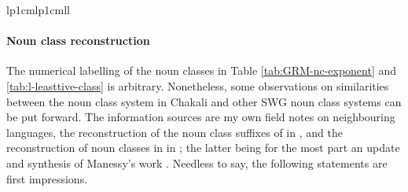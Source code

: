 \begin{exe}
\begin{exe}
\begin{exe}
\begin{exe}
\begin{exe}
\begin{exe}
\begin{table}
\begin{Itabular}{lp{1cm}lp{1cm}ll}
  
 \lspbottomrule
   \end{Itabular}
 \end{table}

\paragraph{Noun class reconstruction}
\label{sec:GRM-noun-class-recons}

The numerical labelling of the noun classes in Table \ref{tab:GRM-nc-exponent} and 
\ref{tab:l-leasttive-class} is arbitrary.  Nonetheless,  some observations  on similarities between 
the noun class system in Chakali and other SWG noun class systems can be put forward. The 
information sources are my own field notes on neighbouring languages, the reconstruction of the noun 
class suffixes of  in \citet{Mane69a, Mane69b},  and the reconstruction of noun classes in  
in \citet{Mieh07}; the latter being for the most part an update and synthesis of Manessy's work 
\citep{Mane69a, Mane69b, Mane75, Mane79, Mane82, Mane99}. Needless to say, the following statements 
are first impressions.


\end{exe}
\end{exe}
\end{exe}
\end{exe}
\end{exe}
\end{exe}
